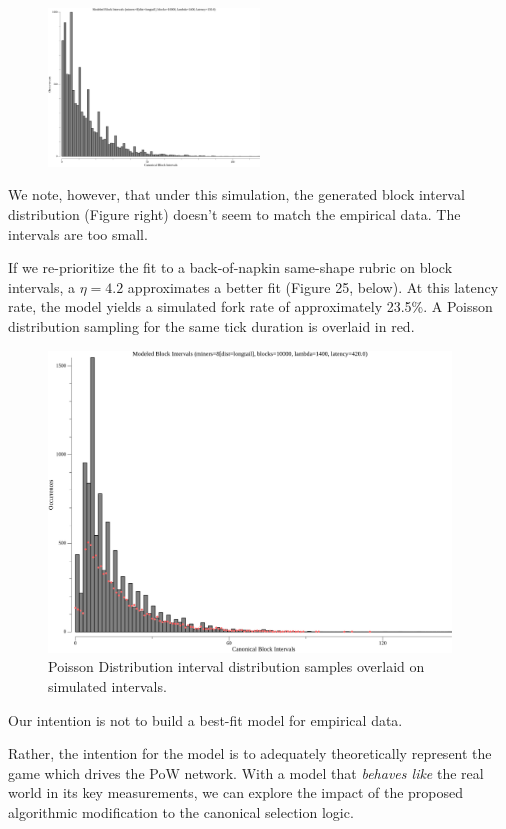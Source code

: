 \documentclass[11pt]{article}
\theoremstyle{plain}
\begin{document}
{\begin{figure}
    \centering
    \includegraphics[width=0.5\textwidth]{sim_a_anteater.png}
\end{figure}

We note, however, that under this simulation, the generated block interval
distribution (Figure right) doesn't seem to match the empirical data.
The intervals are too small.

If we re-prioritize the fit to a back-of-napkin same-shape rubric on block
intervals, a $\eta=4.2$ approximates a better fit (Figure 25, below). At this
latency rate, the model yields a simulated fork rate of approximately 23.5\%.
A Poisson distribution sampling for the same tick duration is overlaid in red.

\begin{figure}[tph]
    \centering
    \includegraphics[height=8cm]{sim_a_bravo.png}
    \caption{
      Poisson Distribution interval distribution samples
      overlaid on simulated intervals.
    }
    \label{fig:sim_a_bravo}
\end{figure}

Our intention is not to build a best-fit model for empirical data.

Rather, the intention for the model is to adequately theoretically represent the game
which drives the PoW network. With a model that \emph{behaves like} the real
world in its key measurements, we can explore the impact of the proposed
algorithmic modification to the canonical selection logic.

}
\end{document}
